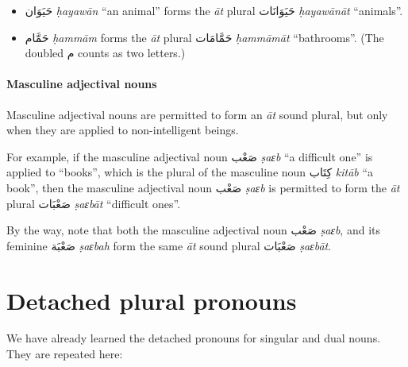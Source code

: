 \documentclass[
  10pt,
]{book}
\providecommand{\tightlist}{%
  \setlength{\itemsep}{0pt}\setlength{\parskip}{0pt}}
\begin{document}
\begin{itemize}
\tightlist
\item
  \foreignlanguage{arabic}{حَيَوَان} \emph{ḥayawān} \enquote{an animal} forms the \emph{āt} plural \foreignlanguage{arabic}{حَيَوَانَات} \emph{ḥayawānāt} \enquote{animals}.
\item
  \foreignlanguage{arabic}{حَمَّام} \emph{ḥammām} forms the \emph{āt} plural \foreignlanguage{arabic}{حَمَّامَات} \emph{ḥammāmāt} \enquote{bathrooms}. (The doubled \foreignlanguage{arabic}{م} counts as two letters.)
\end{itemize}

\paragraph*{Masculine adjectival nouns}\label{masculine-adjectival-nouns}

Masculine adjectival nouns are permitted to form an \emph{āt} sound plural, but only when they are applied to non-intelligent beings.

For example, if the masculine adjectival noun \foreignlanguage{arabic}{صَعْب} \emph{ṣaɛb} \enquote{a difficult one} is applied to \enquote{books}, which is the plural of the masculine noun \foreignlanguage{arabic}{کِتَاب} \emph{kitāb} \enquote{a book}, then the masculine adjectival noun \foreignlanguage{arabic}{صَعْب} \emph{ṣaɛb} is permitted to form the \emph{āt} plural \foreignlanguage{arabic}{صَعْبَات} \emph{ṣaɛbāt} \enquote{difficult ones}.

By the way, note that both the masculine adjectival noun \foreignlanguage{arabic}{صَعْب} \emph{ṣaɛb}, and its feminine \foreignlanguage{arabic}{صَعْبَة} \emph{ṣaɛbah} form the same \emph{āt} sound plural \foreignlanguage{arabic}{صَعْبَات} \emph{ṣaɛbāt}.

\section{Detached plural pronouns}\label{detached-plural-pronouns}

We have already learned the detached pronouns for singular and dual nouns. They are repeated here:
\end{document}
